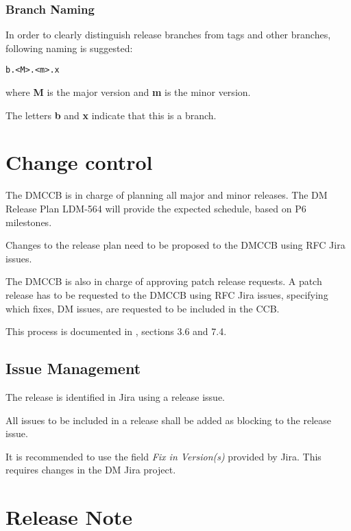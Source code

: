 \subsubsection{Branch Naming}

In order to clearly distinguish release branches from tags and other branches, following naming is suggested:

\begin{verbatim}
b.<M>.<m>.x
\end{verbatim}

where {\bf M} is the major version and {\bf m} is the minor version.

The letters {\bf b} and {\bf x} indicate that this is a branch.

\newpage
\section{Change control} \label{sect:changecontrol}

The DMCCB is in charge of planning all major and minor releases.
The DM Release Plan LDM-564 will provide the expected schedule, based on P6 milestones.

Changes to the release plan need to be proposed to the DMCCB using RFC Jira issues.

The DMCCB is also in charge of approving patch release requests.
A patch release has to be requested to the DMCCB using RFC Jira issues, specifying which fixes, DM issues, are requested to be included in the CCB.

This process is documented in , sections 3.6 and 7.4.


\subsection{Issue Management} \label{sect:issues}

The release is identified in Jira using a release issue.

All issues to be included in a release shall be added as blocking to the release issue.

It is recommended to use the field \textit{Fix in Version(s)} provided by Jira.
This requires changes in the DM Jira project.


\newpage
\section{Release Note} \label{sect:relnote}

